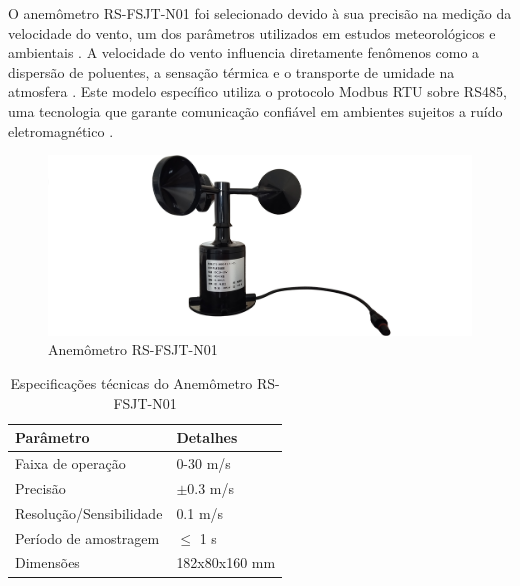 O anemômetro RS-FSJT-N01 foi selecionado devido à sua precisão na medição da velocidade do vento, um dos parâmetros utilizados em estudos meteorológicos e ambientais \parencite{Prathibha_system2017,Amine_system2024}. A velocidade do vento influencia diretamente fenômenos como a dispersão de poluentes, a sensação térmica e o transporte de umidade na atmosfera \parencite{Zhang_evapotranspiration_med2016}. Este modelo específico utiliza o protocolo Modbus RTU sobre RS485, uma tecnologia que garante comunicação confiável em ambientes sujeitos a ruído eletromagnético \parencite{ANEMOMETER}.

\begin{figure}[!htb] \centering
  \caption{Anemômetro RS-FSJT-N01} \label{figura:anemometro}
  \begin{varwidth}{\linewidth}
    \includegraphics[width=16cm]{figuras/Anemometer.png}
  \end{varwidth}
\end{figure}

\begin{table}[!htb]
    \caption{Especificações técnicas do Anemômetro RS-FSJT-N01}
    \begin{tabularx}{\textwidth}{|X|X|} \hline
        \textbf{Parâmetro} & \textbf{Detalhes} \\ \hline
        Faixa de operação & 0-30 m/s \\ \hline
        Precisão & $\pm$0.3 m/s  \\ \hline
        Resolução/Sensibilidade & 0.1 m/s \\ \hline
        Período de amostragem & $\leq$ 1 s \\ \hline
        Dimensões & 182x80x160 mm \\ \hline
    \end{tabularx}
    \label{tab:anemometro}
\end{table}

